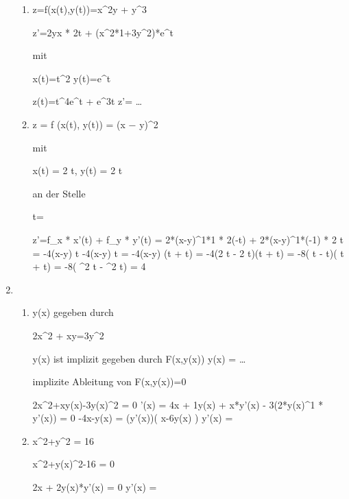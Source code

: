 \begin{enumerate}
\begin{enumerate}

\item %

z=f(x(t),y(t))=x^2y + y^3

z'=2yx * 2t + (x^2*1+3y^2)*e^t

mit

x(t)=t^2
y(t)=e^t

z(t)=t^4e^t + e^3t
z'= \ldots

\item %

z = f (x(t), y(t)) = (x − y)^2

mit

x(t) = 2 \cos t, y(t) = 2 \sin t

an der Stelle

t=

z'=f_x * x'(t) + f_y * y'(t)
= 2*(x-y)^1*1 * 2(-\sin t) + 2*(x-y)^1*(-1) * 2 \cos t
= -4(x-y) \sin t -4(x-y) \cos t
= -4(x-y) (\sin t + \cos t)
= -4(2 \cos t - 2 \sin t)(\sin t + \cos t)
= -8( \cos t - \sin t)( \cos t + \sin t)
= -8( \cos^2 t - \sin^2 t)
= 4
\end{enumerate}

\item %

\begin{enumerate}

\item %

y(x) gegeben durch

2x^2 + xy=3y^2 

y(x) ist implizit gegeben durch F(x,y(x)) 
y(x) = \ldots {}

implizite Ableitung von F(x,y(x))=0
\begin{comment}
1) Ableitung (! y ist eine Fkt in Abh. von x)
2) nach y'(x) umstellen
\end{comment}

2x^2+xy(x)-3y(x)^2 = 0 %
'(x) = 4x + 1y(x) + x*y'(x) - 3(2*y(x)^1 * y'(x)) = 0
-4x-y(x) = (y'(x))( x-6y(x) )
y'(x) = 


\item %

x^2+y^2 = 16

x^2+y(x)^2-16 = 0

2x + 2y(x)*y'(x) = 0
y'(x) = 

\end{enumerate}


\end{enumerate}
